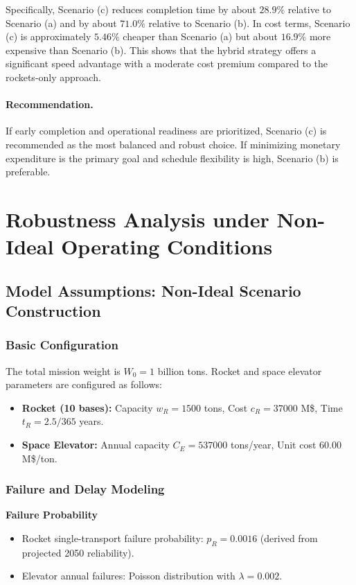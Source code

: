 \documentclass{mcmthesis}
\begin{document}
Specifically, Scenario (c) reduces completion time by about $28.9\%$ relative to Scenario (a) and by about $71.0\%$ relative to Scenario (b). In cost terms, Scenario (c) is approximately $5.46\%$ cheaper than Scenario (a) but about $16.9\%$ more expensive than Scenario (b). This shows that the hybrid strategy offers a significant speed advantage with a moderate cost premium compared to the rockets-only approach.

\paragraph{\textbf{Recommendation.}}

If early completion and operational readiness are prioritized, Scenario (c) is recommended as the most balanced and robust choice. If minimizing monetary expenditure is the primary goal and schedule flexibility is high, Scenario (b) is preferable.


\section{Robustness Analysis under Non-Ideal Operating Conditions}

\subsection{Model Assumptions: Non-Ideal Scenario Construction}
\subsubsection{Basic Configuration}
The total mission weight is $W_0 = 1$ billion tons.
Rocket and space elevator parameters are configured as follows:
\begin{itemize}
    \item \textbf{Rocket (10 bases):} Capacity $w_R = 1500$ tons, Cost $c_R = 37000$ M\$, Time $t_R = 2.5/365$ years.
    \item \textbf{Space Elevator:} Annual capacity $C_E = 537000$ tons/year, Unit cost $60.00$ M\$/ton.
\end{itemize}

\subsubsection{Failure and Delay Modeling}
\textbf{Failure Probability}
\begin{itemize}
    \item Rocket single-transport failure probability: $p_R = 0.0016$ (derived from projected 2050 reliability).
    \item Elevator annual failures: Poisson distribution with $\lambda = 0.002$.
\end{itemize}
\end{document}
